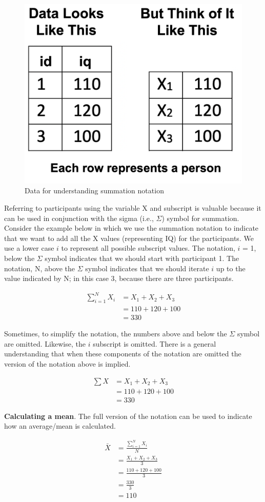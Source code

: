 \documentclass[
]{krantz}
\begin{document}
\begin{figure}
\includegraphics[width=0.4\linewidth]{ch_populations/images/screenshot_data_n6} \caption{Data for understanding summation notation}\label{fig:notationdata}
\end{figure}

Referring to participants using the variable X and subscript is valuable because it can be used in conjunction with the sigma (i.e., \(\Sigma\)) symbol for summation. Consider the example below in which we use the summation notation to indicate that we want to add all the X values (representing IQ) for the participants. We use a lower case \(i\) to represent all possible subscript values. The notation, \(i\) = 1, below the \(\Sigma\) symbol indicates that we should start with participant 1. The notation, N, above the \(\Sigma\) symbol indicates that we should iterate \(i\) up to the value indicated by N; in this case 3, because there are three participants.

\[
\begin{aligned} 
\sum_{i=1}^{N} X_i &=  X_1 + X_2 + X_3\\ 
&= 110 + 120 + 100 \\
&= 330
\end{aligned} 
\]

Sometimes, to simplify the notation, the numbers above and below the \(\Sigma\) symbol are omitted. Likewise, the \(i\) subscript is omitted. There is a general understanding that when these components of the notation are omitted the version of the notation above is implied.

\[
\begin{aligned} 
\sum{X} &= X_1 + X_2 + X_3\\ 
&= 110 + 120 + 100\\
&= 330
\end{aligned} 
\]

\textbf{Calculating a mean}. The full version of the notation can be used to indicate how an average/mean is calculated.

\[
\begin{aligned} 
\bar{X} &= \frac{\sum_{i=1}^{N} X_i}{N} \\
&= \frac{X_1 + X_2 + X_3}{3}\\ 
&= \frac{110 + 120 + 100}{3}\\
&= \frac{330}{3}\\
&= 110\\
\end{aligned} 
\]
\end{document}
